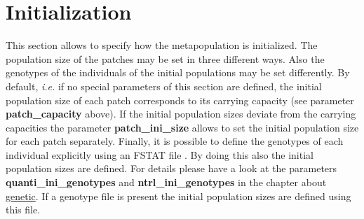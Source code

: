 \documentclass[letterpaper,12pt,oneside]{book}
\begin{document}
\section{Initialization}
This section allows to specify how the metapopulation is initialized. The population size of the patches may be set in three different ways. Also the genotypes of the individuals of the initial populations may be set differently. By default, \textit{i.e.} if no special parameters of this section are defined, the initial population size of each patch corresponds to its carrying capacity (see parameter \textbf{patch\_capacity} above). If the initial population sizes deviate from the carrying capacities the parameter \textbf{patch\_ini\_size} allows to set the initial population size for each patch separately. Finally, it is possible to define the genotypes of each individual explicitly using an FSTAT file \citep{Goudet_1995}. By doing this also the initial population sizes are defined. For details please have a look at the parameters \textbf{quanti\_ini\_genotypes} and \textbf{ntrl\_ini\_genotypes} in the chapter about \hyperref[chap:Genetics]{genetic}. If a genotype file is present the initial population sizes are defined using this file.
\end{document}
